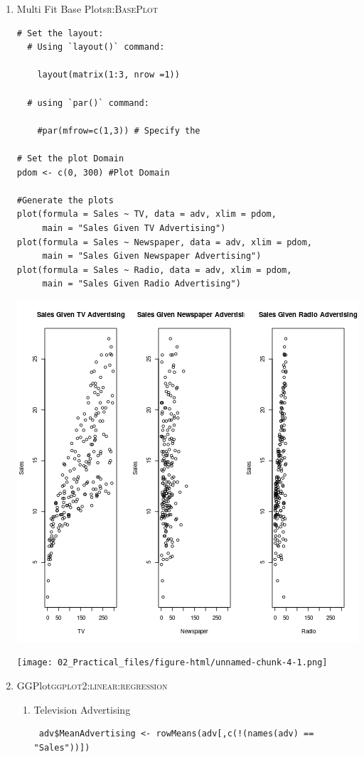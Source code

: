 \documentclass[11pt]{article}
\begin{document}
\begin{enumerate}
\item Multi Fit Base Plots\hfill{}\textsc{r:BasePlot}
\label{sec:org6bb64bc}
\begin{verbatim}
# Set the layout:
  # Using `layout()` command:

    layout(matrix(1:3, nrow =1))

  # using `par()` command:

    #par(mfrow=c(1,3)) # Specify the

# Set the plot Domain
pdom <- c(0, 300) #Plot Domain

#Generate the plots
plot(formula = Sales ~ TV, data = adv, xlim = pdom,
     main = "Sales Given TV Advertising")
plot(formula = Sales ~ Newspaper, data = adv, xlim = pdom,
     main = "Sales Given Newspaper Advertising")
plot(formula = Sales ~ Radio, data = adv, xlim = pdom,
     main = "Sales Given Radio Advertising")
\end{verbatim}

\begin{center}
\includegraphics[width=.9\linewidth]{BaseMergedPlots02IntroData.png}
\end{center}

\begin{center}
\texttt{[image: 02\_Practical\_files/figure-html/unnamed-chunk-4-1.png]}
\end{center}
\item GGPlot\hfill{}\textsc{ggplot2:linear:regression}
\label{sec:org7d602a0}
\begin{enumerate}
\item Television Advertising
\label{sec:orgdd060df}
\begin{verbatim}
 adv$MeanAdvertising <- rowMeans(adv[,c(!(names(adv) == "Sales"))])


\end{verbatim}
\end{enumerate}
\end{enumerate}
\end{document}
